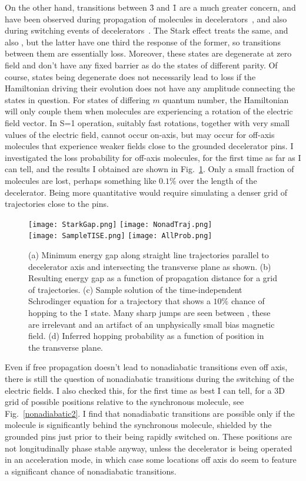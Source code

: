 On the other hand, transitions between \f3 and \f1 are a much greater concern, and have been observed during propagation of molecules in decelerators~\cite{Meek2011}, and also during switching events of decelerators~\cite{Wall2010}.
The Stark effect treats  the same, and also , but the latter have one third the response of the former, so transitions between them are essentially loss.
Moreover, these states are degenerate at zero field and don't have any fixed barrier as do the states of different parity.
Of course, states being degenerate does not necessarily lead to loss if the Hamiltonian driving their evolution does not have any amplitude connecting the states in question.
For states of differing $m$ quantum number, the Hamiltonian will only couple them when molecules are experiencing a rotation of the electric field vector.
In S=1 operation, suitably fast rotations, together with very small values of the electric field, cannot occur on-axis, but may occur for off-axis molecules that experience weaker fields close to the grounded decelerator pins.
I investigated the loss probability for off-axis molecules, for the first time as far as I can tell, and the results I obtained are shown in Fig.~\ref{nonadiabatic1}.
Only a small fraction of molecules are lost, perhaps something like $0.1\%$ over the length of the decelerator.
Being more quantitative would require simulating a denser grid of trajectories close to the pins.

\begin{figure}[t!]
\centering
\texttt{[image: StarkGap.png]}
\texttt{[image: NonadTraj.png]}\\
\texttt{[image: SampleTISE.png]}
\texttt{[image: AllProb.png]}
\caption[Non-adiabatic Transitions Off-Axis]{\label{nonadiabatic1}
(a) Minimum energy gap along straight line trajectories parallel to decelerator axis and intersecting the transverse plane as shown. (b) Resulting energy gap as a function of propagation distance for a grid of trajectories. (c) Sample solution of the time-independent Schr\:odinger equation for a trajectory that shows a $10\%$ chance of hopping to the \f1 state. Many sharp jumps are seen between , these are irrelevant and an artifact of an unphysically small bias magnetic field. (d) Inferred hopping probability as a function of position in the transverse plane.
}
\end{figure}

Even if free propagation doesn't lead to nonadiabatic transitions even off axis, there is still the question of nonadiabatic transitions during the switching of the electric fields.
I also checked this, for the first time as best I can tell, for a 3D grid of possible positions relative to the synchronous molecule, see Fig.~\ref{nonadiabatic2}.
I find that nonadiabatic transitions are possible only if the molecule is significantly behind the synchronous molecule, shielded by the grounded pins just prior to their being rapidly switched on.
These positions are not longitudinally phase stable anyway, unless the decelerator is being operated in an acceleration mode, in which case some locations off axis do seem to feature a significant chance of nonadiabatic transitions.

